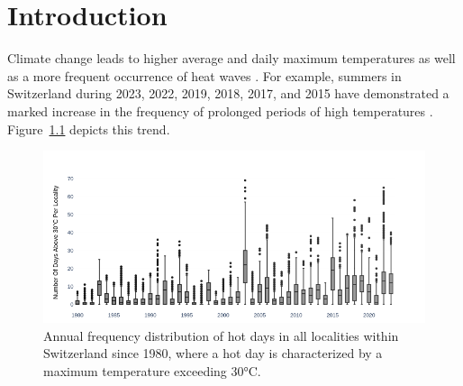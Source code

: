 \chapter{Introduction}\label{chap:introduction}
 Climate change leads to higher average and daily maximum temperatures as well as a more frequent occurrence of heat waves \citep{meteoschweiz_klimaindikatoren_2024, ipcc_2023}. For example, summers in Switzerland during 2023, 2022, 2019, 2018, 2017, and 2015 have demonstrated a marked increase in the frequency of prolonged periods of high temperatures \citep{heatwaves_switzerland}. Figure~\ref{fig:number_of_hot_days} depicts this trend.

  \begin{figure}[H]
    \centering
    \includegraphics[width=\textwidth]{thesis/figures/number_of_hot_days_switzerland.png}
    \caption{Annual frequency distribution of hot days in all localities within Switzerland since 1980, where a hot day is characterized by a maximum temperature exceeding 30°C.}
    \label{fig:number_of_hot_days}
\end{figure}
 
